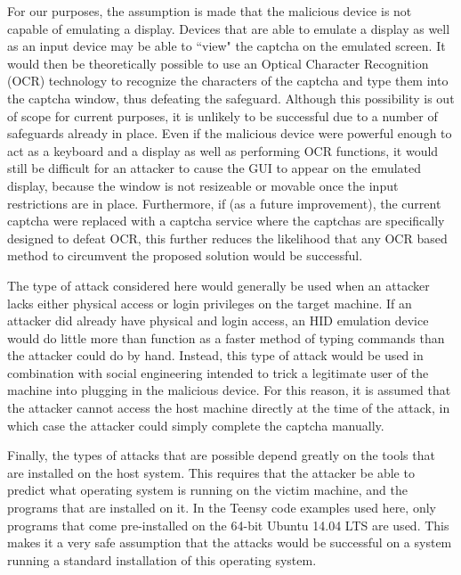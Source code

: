 \documentclass[pagenumbers]{ieee}
\begin{document}
For our purposes, the assumption is made that the malicious device is not capable of emulating a display. Devices that are able to emulate a display as well as an input device may be able to ``view" the captcha on the emulated screen. It would then be theoretically possible to use an Optical Character Recognition (OCR) technology to recognize the characters of the captcha and type them into the captcha window, thus defeating the safeguard. Although this possibility is out of scope for current purposes, it is unlikely to be successful due to a number of safeguards already in place. Even if the malicious device were powerful enough to act as a keyboard and a display as well as performing OCR functions,  it would still be difficult for an attacker to cause the GUI to appear on the emulated display, because the window is not resizeable or movable once the input restrictions are in place. Furthermore, if (as a future improvement), the current captcha were replaced with a captcha service where the captchas are specifically designed to defeat OCR, this further reduces the likelihood that any OCR based method to circumvent the proposed solution would be successful.

The type of attack considered here would generally be used when an attacker lacks either physical access or login privileges on the target machine. If an attacker did already have physical and login access, an HID emulation device would do little more than function as a faster method of typing commands than the attacker could do by hand. Instead, this type of attack would be used in combination with social engineering intended to trick a legitimate user of the machine into plugging in the malicious device. For this reason, it is assumed that the attacker cannot access the host machine directly at the time of the attack, in which case the attacker could simply complete the captcha manually.

Finally, the types of attacks that are possible depend greatly on the tools that are installed on the host system. This requires that the attacker be able to predict what operating system is running on the victim machine, and the programs that are installed on it.  In the Teensy code examples used here, only programs that come pre-installed on the 64-bit Ubuntu 14.04 LTS are used. This makes it a very safe assumption that the attacks would be successful on a system running a standard installation of this operating system. 

\end{document}
